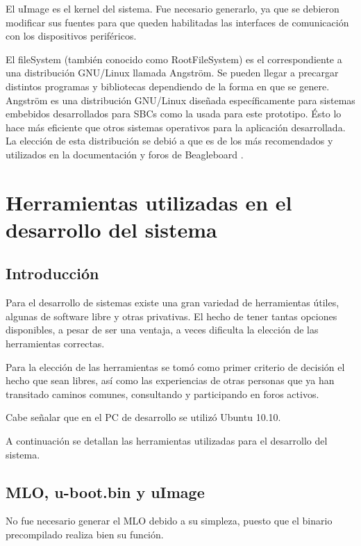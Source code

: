 El uImage es el kernel del sistema. Fue necesario generarlo, ya que se debieron modificar sus fuentes para que queden habilitadas las interfaces de comunicación con los dispositivos periféricos.

El fileSystem (también conocido como RootFileSystem) es el correspondiente a una distribución GNU/Linux llamada Angström. Se pueden llegar a precargar distintos programas y bibliotecas dependiendo de la forma en que se genere.
Angström es una distribución GNU/Linux diseñada específicamente para sistemas embebidos desarrollados
para SBCs como la usada para este prototipo. Ésto lo hace más eficiente que otros sistemas operativos para la aplicación desarrollada. La elección de esta distribución se debió a que es de los más recomendados y utilizados en la documentación y foros de Beagleboard \cite{foroBb}.


\section{Herramientas utilizadas en el desarrollo del sistema}

\subsection{Introducción}
Para el desarrollo de sistemas existe una gran variedad de herramientas útiles, algunas de software libre y otras privativas. El hecho de tener tantas opciones disponibles, a pesar de ser una ventaja, a veces dificulta la elección de las herramientas correctas.

Para la elección de las herramientas se tomó como primer criterio de decisión el hecho que sean libres, así como las experiencias de otras personas que ya han transitado caminos comunes, consultando y participando en foros activos.

\bigskip
Cabe señalar que en el PC de desarrollo se utilizó Ubuntu 10.10.

\bigskip
A continuación se detallan las herramientas utilizadas para el desarrollo del sistema. 

\subsection{MLO, u-boot.bin y uImage}
No fue necesario generar el MLO debido a su simpleza, puesto que el binario precompilado realiza bien su función.

